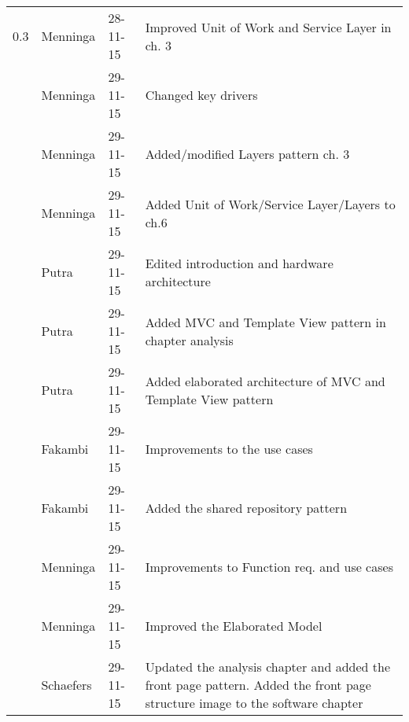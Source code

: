 \begin{longtable}{L{} L{} L{} L{}}
				0.3 & Menninga  & 28-11-15 & Improved Unit of Work and Service Layer in ch. 3 \\
					& Menninga  & 29-11-15 & Changed key drivers \\
					& Menninga  & 29-11-15 & Added/modified Layers pattern ch. 3 \\
					& Menninga  & 29-11-15 & Added Unit of Work/Service Layer/Layers to ch.6 \\
					& Putra		& 29-11-15 & Edited introduction and hardware architecture \\
					& Putra		& 29-11-15 & Added MVC and Template View pattern in chapter analysis\\
					& Putra		& 29-11-15 & Added elaborated architecture of MVC and Template View pattern\\
					& Fakambi   & 29-11-15 & Improvements to the use cases \\
					& Fakambi   & 29-11-15 & Added the shared repository pattern \\
					& Menninga  & 29-11-15 & Improvements to Function req. and use cases\\
					& Menninga  & 29-11-15 & Improved the Elaborated Model \\
					& Schaefers & 29-11-15 & Updated the analysis chapter and added the front page pattern. Added the front page structure image to the software chapter \\

	\bottomrule
\end{longtable}